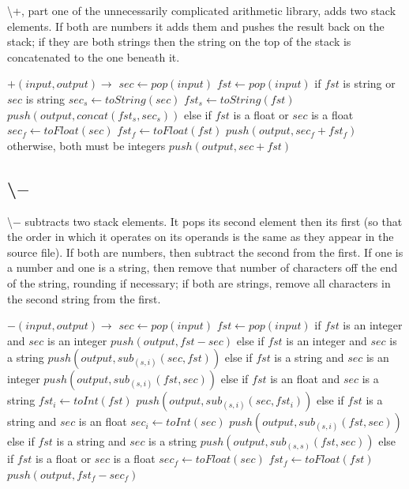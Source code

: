 \documentclass{article}
\let\bs\textbackslash
\def\pc{\bigskip\obeylines\parindent=0pt}
\begin{document}
{{{{{\bs +, part one of the unnecessarily complicated arithmetic library, adds two stack elements.  If both are numbers it adds them and pushes the result back on the stack; if they are both strings then the string on the top of the stack is concatenated to the one beneath it.

{\pc $+(input,output) \rightarrow$
\quad $sec \leftarrow pop(input)$
\quad $fst \leftarrow pop(input)$
\quad if $fst$ is string or $sec$ is string
\quad \quad $sec_s \leftarrow toString(sec)$
\quad \quad $fst_s \leftarrow toString(fst)$
\quad \quad $push(output, concat(fst_s,sec_s))$
\quad else if $fst$ is a float or $sec$ is a float
\quad \quad $sec_f \leftarrow toFloat(sec)$
\quad \quad $fst_f \leftarrow toFloat(fst)$
\quad \quad $push(output, sec_f + fst_f)$
\quad otherwise, both must be integers
\quad \quad $push(output, sec + fst)$
}

\subsection{\bs $-$}

\bs $-$ subtracts two stack elements.  It pops its second element then its first (so that the order in which it operates on its operands is the same as they appear in the source file).  If both are numbers, then subtract the second from the first.  If one is a number and one is a string, then remove that number of characters off the end of the string, rounding if necessary; if both are strings, remove all characters in the second string from the first.

{\pc $-(input, output) \rightarrow$
\quad $sec \leftarrow pop(input)$
\quad $fst \leftarrow pop(input)$
\quad if $fst$ is an integer and $sec$ is an integer
\quad \quad $push(output, fst - sec)$
\quad else if $fst$ is an integer and $sec$ is a string
\quad \quad $push(output, sub_{(s,i)}(sec, fst))$
\quad else if $fst$ is a string and $sec$ is an integer
\quad \quad $push(output, sub_{(s,i)}(fst, sec))$
\quad else if $fst$ is an float and $sec$ is a string
\quad \quad $fst_i \leftarrow toInt(fst)$
\quad \quad $push(output, sub_{(s,i)}(sec, fst_i))$
\quad else if $fst$ is a string and $sec$ is an float
\quad \quad $sec_i \leftarrow toInt(sec)$
\quad \quad $push(output, sub_{(s,i)}(fst, sec))$
\quad else if $fst$ is a string and $sec$ is a string
\quad \quad $push(output, sub_{(s,s)}(fst, sec))$
\quad else if $fst$ is a float or $sec$ is a float
\quad \quad $sec_f \leftarrow toFloat(sec)$
\quad \quad $fst_f \leftarrow toFloat(fst)$
\quad \quad $push(output, fst_f - sec_f)$

}}}}}}
\end{document}
